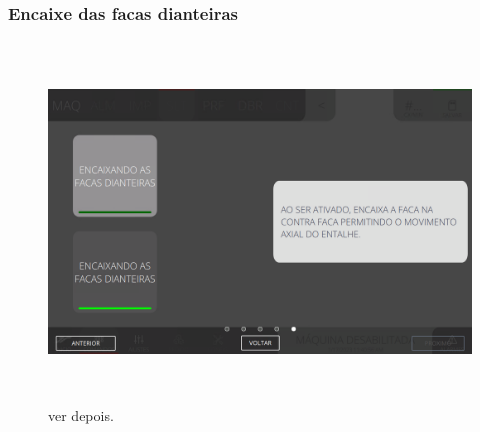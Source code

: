 \newpage
\thispagestyle{fancy}
\vspace*{\fill}
\subsubsection{\small{Encaixe das facas dianteiras}}
\begin{figure}[h]
  \centering
  \includegraphics[width=576px,height=360px]{src/images/05-slotter/commands/e-5.png}
  \caption{ver depois.}
   \label{}
\end{figure}
\vspace*{\fill}

